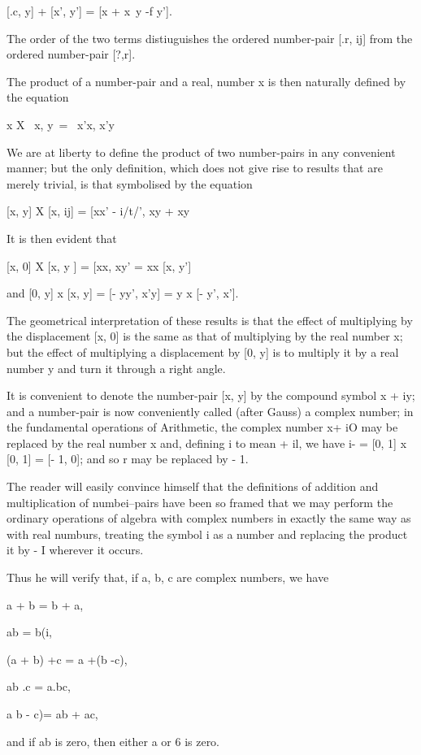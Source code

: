[.c, y] + [x', y'] = [x + x\ y -f y'].

The order of the two terms distiuguishes the ordered number-pair [.r,
ij] from the ordered number-pair [?,r].

%
%

The product of a number-pair and a real, number x is then naturally
defined by the equation

x X \ x, y\ = \ x'x, x'y\

We are at liberty to define the product of two number-pairs in any
convenient manner; but the only definition, which does not give rise
to results that are merely trivial, is that symbolised by the equation

[x, y] X [x, ij] = [xx' - i/t/', xy + xy\

It is then evident that

[x, 0] X [x, y ] = [xx, xy' = xx [x, y']

and [0, y] x [x, y] = [- yy', x'y] = y x [- y', x'].

The geometrical interpretation of these results is that the effect of
multiplying by the displacement [x, 0] is the same as that of
multiplying by the real number x; but the effect of multiplying a
displacement by [0, y] is to multiply it by a real number y and turn
it through a right angle.

It is convenient to denote the number-pair [x, y] by the compound
symbol x + iy; and a number-pair is now conveniently called (after
Gauss) a complex number; in the fundamental operations of Arithmetic,
the complex number x+ iO may be replaced by the real number x and,
defining i to mean + il, we have i- = [0, 1] x [0, 1] = [- 1, 0]; and
so r may be replaced by - 1.

The reader will easily convince himself that the definitions of
addition and multiplication of numbei--pairs have been so framed that
we may perform the ordinary operations of algebra with complex numbers
in exactly the same way as with real numburs, treating the symbol i as
a number and replacing the product it by - I wherever it occurs.

Thus he will verify that, if a, b, c are complex numbers, we have

a + b = b + a,

ab = b(i,

(a + b) +c = a +(b -\-c),

ab .c = a.bc,

a b -\- c)= ab + ac,

and if ab is zero, then either a or 6 is zero.

